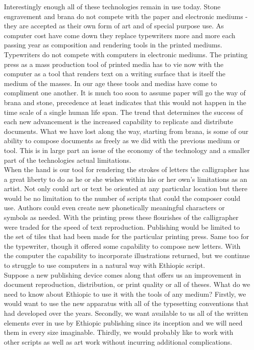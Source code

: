 Interestingly enough all of these technologies remain in use today.  Stone engravement and brana do not compete with the paper and electronic mediums -they are accepted as their own form of art and of special purpose use.  As computer cost have come down they replace typewriters more and more each passing year as composition and rendering tools in the printed mediums. Typewriters do not compete with computers in electronic mediums.  The printing press as a mass production tool of printed media has to vie now with the computer as a tool that renders text on a writing surface that is itself the medium of the masses.  In our age these tools and medias have come to compliment one another.  It is much too soon to assume paper will go the way of brana and stone, precedence at least indicates that this would not happen in the time scale of a single human life span.
\newpage
The trend that determines the success of each new advancement is the increased capability to replicate and distribute documents.  What we have lost along the way, starting from brana, is some of our ability to compose documents as freely as we did with the previous medium or tool.  This is in large part an issue of the economy of the technology and a smaller part of the technologies actual limitations.\\

When the hand is our tool for rendering the strokes of letters the calligrapher has a great liberty to do as he or she wishes within his or her own's limitations as an artist.  Not only could art or text be oriented at any particular location but there would be no limitation to the number of scripts that could the composer could use.  Authors could even create new phonetically meaningful characters or symbols as needed.  With the printing press these flourishes of the calligrapher were traded for the speed of text reproduction. Publishing would be limited to the set of tiles that had been made for the particular printing press.  Same too for the typewriter, though it offered some capability to compose new letters.  With the computer the capability to incorporate illustrations returned, but we continue to struggle to use computers in a natural way with Ethiopic script.\\


Suppose a new publishing device comes along that offers us an improvement in document reproduction, distribution, or print quality or all of theses.  What do we need to know about Ethiopic to use it with the tools of any medium?  Firstly, we would want to use the new apparatus with all of the typesetting conventions that had developed over the years.  Secondly, we want available to us all of the written elements ever in use by Ethiopic publishing since its inception and we will need them in every size imaginable.  Thirdly, we would probably like to work with other scripts as well as art work without incurring additional complications.  \\

